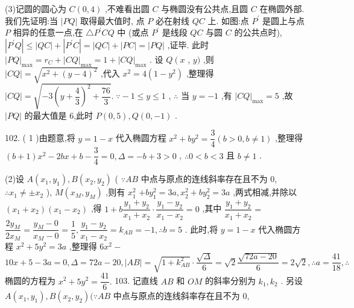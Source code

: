 (3)记圆的圆心为 $C\left( {0,4}\right)$ ,不难看出圆 $C$ 与椭圆没有公共点,且圆 $C$ 在椭圆外部. 我们先证明:当 $\left| {PQ}\right|$ 取得最大值时, 点 $P$ 必在射线 ${QC}$ 上. 如图:点 ${P}^{\prime }$ 是圆上与点 $P$ 相异的任意一点,在 $\bigtriangleup {P}^{\prime }{CQ}$ 中 (或点 ${P}^{\prime }$ 是线段 ${QC}$ 与圆 $C$ 的公共点时), $\left| {{P}^{\prime }Q}\right|  \leq  \left| {QC}\right|  + \left| {{P}^{\prime }C}\right|  = \left| {QC}\right|  + \left| {PC}\right|  = \left| {PQ}\right|$ ,证毕. 此时 ${\left| PQ\right| }_{\max } = {r}_{C} + {\left| CQ\right| }_{\max } = 1 + {\left| CQ\right| }_{\max }$ . 设 $Q\left( x\right.$ , $y)$ ,则 $\left| {CQ}\right|  = \sqrt{{x}^{2} + {\left( y - 4\right) }^{2}}$ ,代入 ${x}^{2} = 4\left( {1 - {y}^{2}}\right)$ ,整理得 $\left| {CQ}\right|  = \sqrt{-3{\left( y + \dfrac{4}{3}\right) }^{2} + \dfrac{76}{3}}.\;\because  - 1 \leq  y \leq  1$ , $\therefore$ 当 $y =  - 1$ ,有 ${\left| CQ\right| }_{\max } = 5$ ,故 $\left| {PQ}\right|$ 的最大值是 6,此时 $P\left( {0,5}\right) ,Q\left( {0, - 1}\right)$ .

102. ( 1 )由题意,将 $y = 1 - x$ 代入椭圆方程 ${x}^{2} + b{y}^{2} = \dfrac{3}{4}\left( {b > 0,b \neq  1}\right)$ ,整理得 $\left( {b + 1}\right) {x}^{2} - {2bx} + b - \dfrac{3}{4} = 0,\Delta  =  - b + 3 > 0$ , $\therefore 0 < b < 3$ 且 $b \neq  1$ .

(2)设 $A\left( {{x}_{1},{y}_{1}}\right) ,B\left( {{x}_{2},{y}_{2}}\right)$ ( $\because {AB}$ 中点与原点的连线斜率存在且不为 0, $\therefore {x}_{1} \neq   \pm  {x}_{2}$ ), $M\left( {{x}_{M},{y}_{M}}\right)$ ,则有 ${x}_{1}^{2}$  $+ b{y}_{1}^{2} = {3a},{x}_{2}^{2} + b{y}_{2}^{2} = {3a}$ ,两式相减,并除以 $\left( {{x}_{1} + {x}_{2}}\right) \left( {{x}_{1} - {x}_{2}}\right)$ ,得 $1 + b\dfrac{{y}_{1} + {y}_{2}}{{x}_{1} + {x}_{2}} \cdot  \dfrac{{y}_{1} - {y}_{2}}{{x}_{1} - {x}_{2}} = 0$ ,其中 $\dfrac{{y}_{1} + {y}_{2}}{{x}_{1} + {x}_{2}} =$  $\dfrac{2{y}_{M}}{2{x}_{M}} = \dfrac{{y}_{M} - 0}{{x}_{M} - 0} = \dfrac{1}{5},\dfrac{{y}_{1} - {y}_{2}}{{x}_{1} - {x}_{2}} = {k}_{AB} =  - 1,\therefore b = 5$ . 此时,将 $y = 1 - x$ 代入椭圆方程 ${x}^{2} + 5{y}^{2} = {3a}$ ,整理得 $6{x}^{2} -$  ${10x} + 5 - {3a} = 0,\Delta  = {72a} - {20},\left| {AB}\right|  = \sqrt{1 + {k}_{AB}^{2}} \cdot  \dfrac{\sqrt{\Delta }}{6} = \sqrt{2}\dfrac{\sqrt{{72a} - {20}}}{6} = 2\sqrt{2},\therefore a = \dfrac{41}{18},\therefore$ 椭圆的方程为 ${x}^{2} + 5{y}^{2} = \dfrac{41}{6}.$ 103. 记直线 ${AB}$ 和 ${OM}$ 的斜率分别为 ${k}_{1},{k}_{2}$ . 另设 $A\left( {{x}_{1},{y}_{1}}\right) ,B\left( {{x}_{2},{y}_{2}}\right) (\because {AB}$ 中点与原点的连线斜率存在且不为 0,

